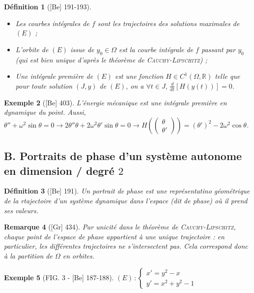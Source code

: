 \documentclass[10pt, a4paper, parskip=full, twoside, twocolumn]{report}
\newtheorem{definition}{Définition}
\newtheorem{example}[definition]{Exemple}
\newtheorem{remark}[definition]{Remarque}
\newcommand{\IR}{\mathbb{R}}
\begin{document}
\begin{definition}[\textnormal{[Be] 191-193}]
	\begin{itemize}
		\item Les \emph{courbes intégrales de $f$} sont les trajectoires des solutions maximales de $(E)$ ;
		\item L'\emph{orbite de $(E)$ issue de $y_0\in\Omega$} est la courbe intégrale de $f$ passant par $y_0$ (qui est bien unique d'après le théorème de \textsc{Cauchy-Lipschitz}) ;
		\item Une \emph{intégrale première de $(E)$} est une fonction $H\in C^1(\Omega,\IR)$ telle que pour toute solution $(J,y)$ de $(E)$, on a $\forall t\in J,\, \frac{d}{dt}\left[H(y(t))\right] = 0$.
	\end{itemize}
\end{definition}

\begin{example}[\textnormal{[Be] 403}]
	L'énergie mécanique est une intégrale première en dynamique du point.
	Aussi, $\theta'' + \omega^2\sin \theta = 0 \longrightarrow 2\theta''\theta + 2\omega^2\theta'\sin\theta = 0\longrightarrow H\left(\begin{pmatrix}
		\theta\\\theta'
	\end{pmatrix}\right) = \left(\theta'\right)^2 - 2\omega^2\cos\theta$.
\end{example}

\subsection*{B. Portraits de phase d'un système autonome en dimension / degré $2$}
\begin{definition}[\textnormal{[Be] 191}]
	Un \emph{portrait de phase} est une représentatino géométrique de la rtajectoire d'un système dynamique dans l'espace (dit \emph{de phase}) où il prend ses valeurs.
\end{definition}

\begin{remark}[\textnormal{[Gr] 434}]
	Par unicité dans le théorème de \textsc{Cauchy-Lipschitz}, chaque point de l'espace de phase appartient à une unique trajectoire : en particulier, les différentes trajectoires ne s'intersectent pas. Cela correspond donc à la partition de $\Omega$ en orbites.
\end{remark}

\begin{example}[FIG. 3 - \textnormal{[Be] 187-188}]
	$(E)\,\colon\begin{cases}
		x'=y^2-x \\ y' = x^2+y^2 - 1
	\end{cases}$
\end{example}
\end{document}
